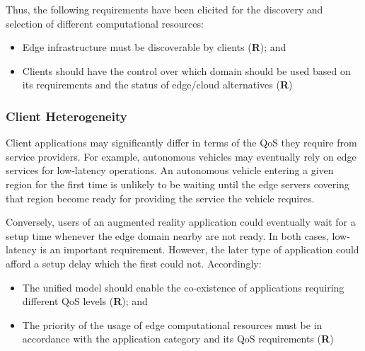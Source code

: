Thus, the following requirements have been elicited for the discovery and selection of different computational resources:


\begin{itemize}

	\item Edge infrastructure must be discoverable by clients (\textbf{R}); and

	\item Clients should have the control over which domain should be used based on its requirements and the status of edge/cloud alternatives (\textbf{R})

\end{itemize}


\subsubsection{Client Heterogeneity}

Client applications may significantly differ in terms of the QoS they require from service providers. For example, autonomous vehicles may eventually rely on edge services for low-latency operations. An autonomous vehicle entering a given region for the first time is unlikely to be waiting until the edge servers covering that region become ready for providing the service the vehicle requires. 

Conversely, users of an augmented reality application could eventually wait for a setup time whenever the edge domain nearby are not ready. In both cases, low-latency is an important requirement. However, the later type of application could afford a setup delay which the first could not. Accordingly:

\begin{itemize}
	\item The unified model should enable the co-existence of applications requiring different QoS levels (\textbf{R}); and
	
	\item The priority of the usage of edge computational resources must be in accordance with the application category and its QoS requirements (\textbf{R})
\end{itemize}


